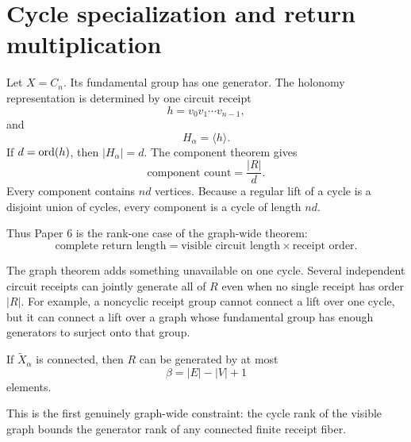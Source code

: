 \section{Cycle specialization and return multiplication}

Let $X=C_n$. Its fundamental group has one generator. The holonomy
representation is determined by one circuit receipt
\[
h=v_0v_1\cdots v_{n-1},
\]
and
\[
H_{\alpha}=\langle h\rangle.
\]
If $d=\operatorname{ord}(h)$, then $|H_{\alpha}|=d$. The component theorem gives
\[
\text{component count}=\frac{|R|}{d}.
\]
Every component contains $nd$ vertices. Because a regular lift of a cycle is
a disjoint union of cycles, every component is a cycle of length $nd$.

Thus Paper 6 is the rank-one case of the graph-wide theorem:
\[
\text{complete return length}
=
\text{visible circuit length}\times\text{receipt order}.
\]

The graph theorem adds something unavailable on one cycle. Several
independent circuit receipts can jointly generate all of $R$ even when no
single receipt has order $|R|$. For example, a noncyclic receipt group cannot
connect a lift over one cycle, but it can connect a lift over a graph whose
fundamental group has enough generators to surject onto that group.

\begin{corollary}
If $\widetilde X_{\alpha}$ is connected, then $R$ can be generated by at most
\[
\beta=|E|-|V|+1
\]
elements.
\end{corollary}

This is the first genuinely graph-wide constraint: the cycle rank of the
visible graph bounds the generator rank of any connected finite receipt
fiber.
